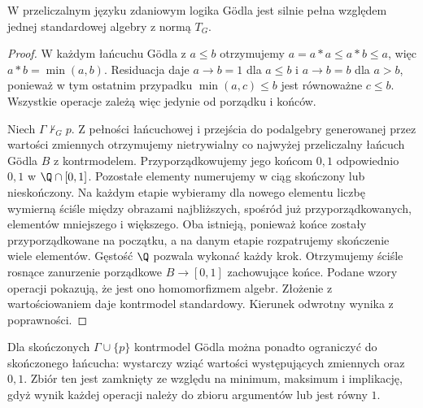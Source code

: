 \begin{twierdzenie}
\label{thm:lst-fuzzy-godel-standard}
W przeliczalnym języku zdaniowym logika Gödla jest silnie
pełna względem jednej standardowej algebry z normą $T_G$.
\end{twierdzenie}
\begin{proof}
W każdym łańcuchu Gödla z $a\leq b$ otrzymujemy
$a=a*a\leq a*b\leq a$, więc $a*b=\min(a,b)$.
Residuacja daje $a\to b=1$ dla $a\leq b$ i $a\to b=b$
dla $a>b$, ponieważ w tym ostatnim przypadku
$\min(a,c)\leq b$ jest równoważne $c\leq b$.
Wszystkie operacje zależą więc jedynie od porządku i końców.

Niech $\Gamma\nvdash_G p$. Z pełności łańcuchowej
i przejścia do podalgebry generowanej przez wartości
zmiennych otrzymujemy nietrywialny co najwyżej
przeliczalny łańcuch Gödla $B$ z kontrmodelem.
Przyporządkowujemy jego końcom $0,1$ odpowiednio $0,1$
w $\Q\cap[0,1]$. Pozostałe elementy numerujemy
w ciąg skończony lub nieskończony. Na każdym etapie
wybieramy dla nowego elementu liczbę wymierną ściśle
między obrazami najbliższych, spośród już przyporządkowanych,
elementów mniejszego i większego. Oba istnieją, ponieważ
końce zostały przyporządkowane na początku, a na danym
etapie rozpatrujemy skończenie wiele elementów.
Gęstość $\Q$ pozwala wykonać każdy krok. Otrzymujemy
ściśle rosnące zanurzenie porządkowe $B\to[0,1]$
zachowujące końce. Podane wzory operacji pokazują,
że jest ono homomorfizmem algebr.
Złożenie z wartościowaniem daje kontrmodel standardowy.
Kierunek odwrotny wynika z poprawności.
\end{proof}
Dla skończonych $\Gamma\cup\{p\}$ kontrmodel Gödla można
ponadto ograniczyć do skończonego łańcucha: wystarczy
wziąć wartości występujących zmiennych oraz $0,1$.
Zbiór ten jest zamknięty ze względu na minimum, maksimum
i implikację, gdyż wynik każdej operacji należy do
zbioru argumentów lub jest równy $1$.

